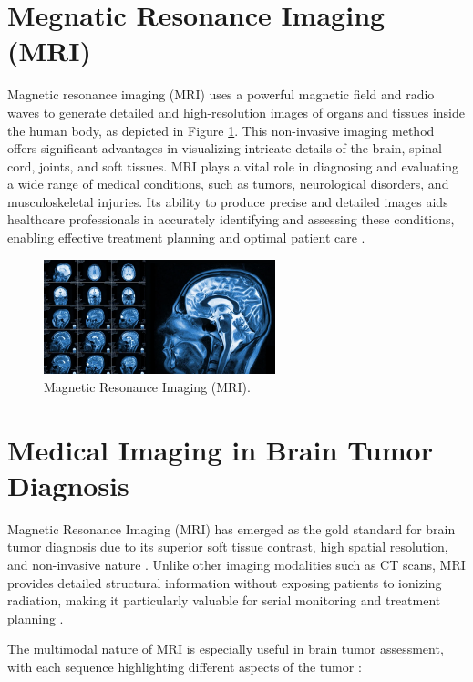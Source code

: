 \section{Megnatic Resonance Imaging (MRI)}
\label{sec:mri}
Magnetic resonance imaging (MRI) uses a powerful magnetic field and radio waves to
generate detailed and high-resolution images of organs and tissues inside the human body, as
depicted in Figure \ref{fig:mri}. This non-invasive imaging method offers significant advantages in
visualizing intricate details of the brain, spinal cord, joints, and soft tissues. MRI plays a vital
role in diagnosing and evaluating a wide range of medical conditions, such as tumors,
neurological disorders, and musculoskeletal injuries. Its ability to produce precise and detailed
images aids healthcare professionals in accurately identifying and assessing these conditions,
enabling effective treatment planning and optimal patient care \cite{verywell_mri}.

\begin{figure}[H]
  \centering
  \includegraphics[width=0.6\textwidth]{Images/Chapter1/mri.png}
  \caption{Magnetic Resonance Imaging (MRI).}
  \label{fig:mri}
\end{figure}

\section{Medical Imaging in Brain Tumor Diagnosis}

Magnetic Resonance Imaging (MRI) has emerged as the gold standard for brain tumor diagnosis due to its superior soft tissue contrast, high spatial resolution, and non-invasive nature \cite{Bauer2013}. Unlike other imaging modalities such as CT scans, MRI provides detailed structural information without exposing patients to ionizing radiation, making it particularly valuable for serial monitoring and treatment planning \cite{Menze2015}.

The multimodal nature of MRI is especially useful in brain tumor assessment, with each sequence highlighting different aspects of the tumor \cite{Bakas2018}:

